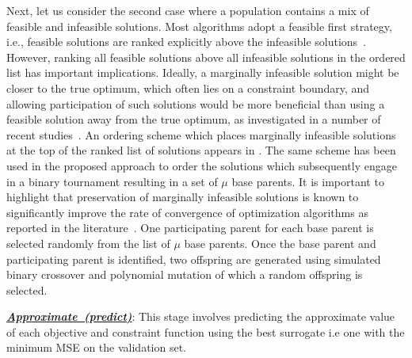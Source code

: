 \documentclass[twocolumn,10pt]{asme2ej}
\begin{document}
Next, let us consider the second case where a population contains a mix of feasible and infeasible solutions. Most algorithms adopt a feasible first strategy, i.e., feasible solutions are ranked explicitly above the infeasible solutions~\cite{deb2001multi}. However, ranking all feasible solutions above all infeasible solutions in the ordered list has important implications\cite{KHTSingh2013idea}. Ideally, a marginally infeasible solution might be closer to the true optimum, which often lies on a constraint boundary, and allowing participation of such solutions would be more beneficial than using a feasible solution away from the true optimum, as investigated in a number of recent studies~\cite{KHTsingh2016use}. An ordering scheme which places marginally infeasible solutions at the top of the ranked list of solutions appears in \cite{KHTSingh2013idea,KHTRay2009idea}. The same scheme has been used in the proposed approach to order the solutions which subsequently engage in a binary tournament resulting in a set of $\mu$ base parents. It is important to highlight that preservation of marginally infeasible solutions is known to significantly improve the rate of convergence of optimization algorithms as reported in the literature~\cite{KHTsingh2016use, KHTtakahama2005constrained,KHTRay2009idea}. One participating parent for each base parent is selected randomly from the list of $\mu$ base parents. Once the base parent and participating parent is identified, two offspring are generated using simulated binary crossover and polynomial mutation of which a random offspring is selected.  
	
\noindent \underline{\it \textbf{Approximate~(predict)}}: This stage involves predicting the approximate value of each objective and constraint function using the best surrogate i.e one with the minimum MSE on the validation set.
	
\end{document}
